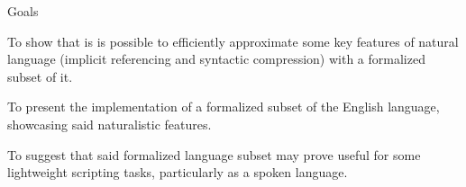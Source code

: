Goals

To show that is is possible to efficiently approximate some key features of natural language (implicit referencing and syntactic compression) with a formalized subset of it.

To present the implementation of a formalized subset of the English language, showcasing said naturalistic features.

To suggest that said formalized language subset may prove useful for some lightweight scripting tasks, particularly as a spoken language.
